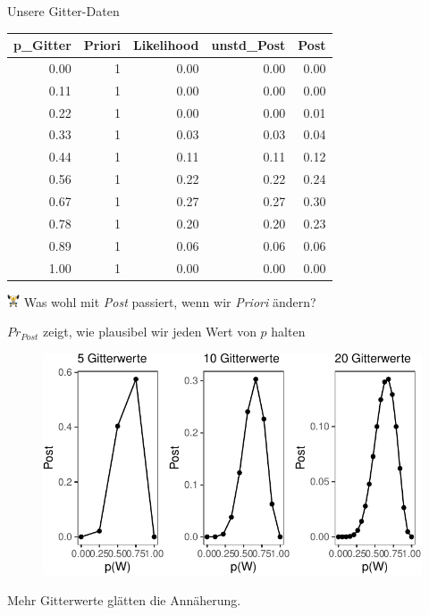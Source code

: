 \documentclass[
  ngerman,
  ignorenonframetext,
]{beamer}
\begin{document}
\begin{frame}{Unsere Gitter-Daten}
\protect\hypertarget{unsere-gitter-daten}{}
\begin{tabular}[t]{r|r|r|r|r}
\hline
p\_Gitter & Priori & Likelihood & unstd\_Post & Post\\
\hline
0.00 & 1 & 0.00 & 0.00 & 0.00\\
\hline
0.11 & 1 & 0.00 & 0.00 & 0.00\\
\hline
0.22 & 1 & 0.00 & 0.00 & 0.01\\
\hline
0.33 & 1 & 0.03 & 0.03 & 0.04\\
\hline
0.44 & 1 & 0.11 & 0.11 & 0.12\\
\hline
0.56 & 1 & 0.22 & 0.22 & 0.24\\
\hline
0.67 & 1 & 0.27 & 0.27 & 0.30\\
\hline
0.78 & 1 & 0.20 & 0.20 & 0.23\\
\hline
0.89 & 1 & 0.06 & 0.06 & 0.06\\
\hline
1.00 & 1 & 0.00 & 0.00 & 0.00\\
\hline
\end{tabular}

\includegraphics[width=1em]{../img/weight.pdf} Was wohl mit \emph{Post}
passiert, wenn wir \emph{Priori} ändern?
\end{frame}

\begin{frame}{\(Pr_{Post}\) zeigt, wie plausibel wir jeden Wert von
\(p\) halten}
\protect\hypertarget{pr_post-zeigt-wie-plausibel-wir-jeden-wert-von-p-halten}{}
\begin{figure}[H]
\includegraphics[width=1\linewidth]{unnamed-chunk-30-1} \end{figure}

Mehr Gitterwerte glätten die Annäherung.
\end{frame}
\end{document}
